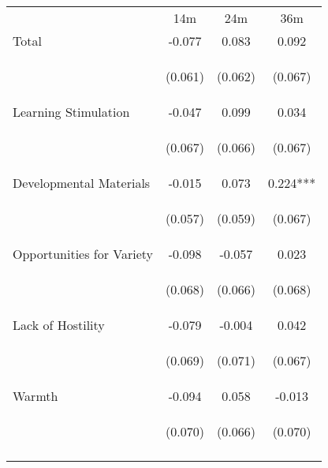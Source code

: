 \begin{tabular}{lccc}
\hline \noalign{\smallskip} & 14m & 24m & 36m\\
\noalign{\smallskip}\hline \noalign{\smallskip}Total & -0.077 & 0.083 & 0.092\\
 & \begin{footnotesize}(0.061)\end{footnotesize} & \begin{footnotesize}(0.062)\end{footnotesize} & \begin{footnotesize}(0.067)\end{footnotesize}\\
\noalign{\smallskip}Learning Stimulation & -0.047 & 0.099 & 0.034\\
 & \begin{footnotesize}(0.067)\end{footnotesize} & \begin{footnotesize}(0.066)\end{footnotesize} & \begin{footnotesize}(0.067)\end{footnotesize}\\
\noalign{\smallskip}Developmental Materials & -0.015 & 0.073 & 0.224***\\
 & \begin{footnotesize}(0.057)\end{footnotesize} & \begin{footnotesize}(0.059)\end{footnotesize} & \begin{footnotesize}(0.067)\end{footnotesize}\\
\noalign{\smallskip}Opportunities for Variety & -0.098 & -0.057 & 0.023\\
 & \begin{footnotesize}(0.068)\end{footnotesize} & \begin{footnotesize}(0.066)\end{footnotesize} & \begin{footnotesize}(0.068)\end{footnotesize}\\
\noalign{\smallskip}Lack of Hostility & -0.079 & -0.004 & 0.042\\
 & \begin{footnotesize}(0.069)\end{footnotesize} & \begin{footnotesize}(0.071)\end{footnotesize} & \begin{footnotesize}(0.067)\end{footnotesize}\\
\noalign{\smallskip}Warmth & -0.094 & 0.058 & -0.013\\
 & \begin{footnotesize}(0.070)\end{footnotesize} & \begin{footnotesize}(0.066)\end{footnotesize} & \begin{footnotesize}(0.070)\end{footnotesize}\\
\noalign{\smallskip}\hline\end{tabular}\\
